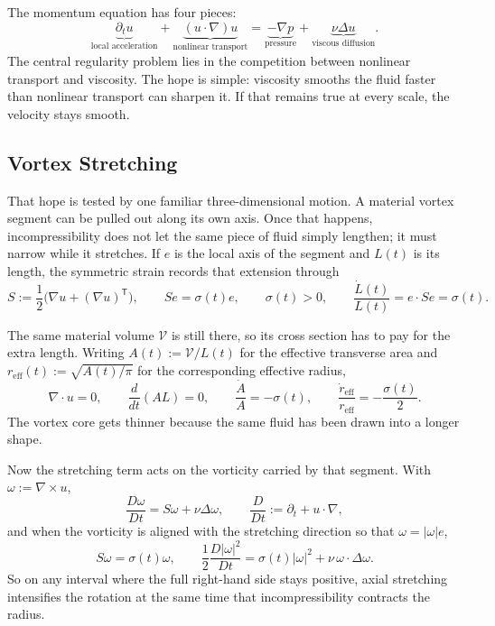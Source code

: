 
The momentum equation has four pieces:
\[
  \underbrace{\partial_t u}_{\text{local acceleration}}
  +
  \underbrace{(u\cdot\nabla)u}_{\text{nonlinear transport}}
  =
  \underbrace{-\nabla p}_{\text{pressure}}
  +
  \underbrace{\nu\Delta u}_{\text{viscous diffusion}}.
\]
The central regularity problem lies in the competition between nonlinear transport and viscosity.
The hope is simple: viscosity smooths the fluid faster than nonlinear transport can sharpen it.
If that remains true at every scale, the velocity stays smooth.

\subsection{Vortex Stretching}\label{sub:ThePerfectlyStretchingVortex}

That hope is tested by one familiar three-dimensional motion. A material vortex segment can be pulled out along its own axis. Once that happens, incompressibility does not let the same piece of fluid simply lengthen; it must narrow while it stretches. If \(e\) is the local axis of the segment and \(L(t)\) is its length, the symmetric strain records that extension through
\[
  S:=\frac12\bigl(\nabla u+(\nabla u)^{\mathsf T}\bigr),
  \qquad
  Se=\sigma(t)e,
  \qquad
  \sigma(t)>0,
  \qquad
  \frac{\dot L(t)}{L(t)}
  =
  e\cdot Se
  =
  \sigma(t).
\]

The same material volume \(\mathcal V\) is still there, so its cross section has to pay for the extra length. Writing \(A(t):=\mathcal V/L(t)\) for the effective transverse area and \(r_{\mathrm{eff}}(t):=\sqrt{A(t)/\pi}\) for the corresponding effective radius,
\[
  \nabla\cdot u=0,
  \qquad
  \frac{d}{dt}(A L)=0,
  \qquad
  \frac{\dot A}{A}=-\sigma(t),
  \qquad
  \frac{\dot r_{\mathrm{eff}}}{r_{\mathrm{eff}}}
  =
  -\frac{\sigma(t)}{2}.
\]
The vortex core gets thinner because the same fluid has been drawn into a longer shape.

Now the stretching term acts on the vorticity carried by that segment. With \(\omega:=\nabla\times u\),
\[
  \frac{D\omega}{Dt}
  =
  S\omega+\nu\Delta\omega,
  \qquad
  \frac{D}{Dt}
  :=
  \partial_t+u\cdot\nabla,
\]
and when the vorticity is aligned with the stretching direction so that \(\omega=|\omega|e\),
\[
  S\omega
  =
  \sigma(t)\omega,
  \qquad
  \frac12\frac{D|\omega|^2}{Dt}
  =
  \sigma(t)|\omega|^2
  +
  \nu\,\omega\cdot\Delta\omega.
\]
So on any interval where the full right-hand side stays positive, axial stretching intensifies the rotation at the same time that incompressibility contracts the radius.

